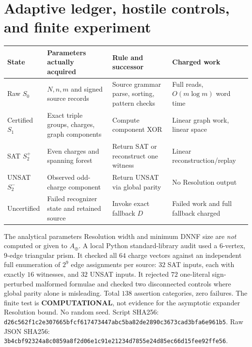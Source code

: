 \documentclass[11pt]{article}
\begin{document}
\section{Adaptive ledger, hostile controls, and finite experiment}
\small
\begin{center}
\begin{tabular}{p{.18\linewidth}p{.28\linewidth}p{.27\linewidth}p{.18\linewidth}}\toprule
State & Parameters actually acquired & Rule and successor & Charged work\\\midrule
Raw $S_0$ & $N,n,m$ and signed source records & Source grammar parse, sorting, pattern checks & Full reads, $O(m\log m)$ word time\\
Certified $S_1$ & Exact triple groups, charges, graph components & Compute component XOR & Linear graph work, linear space\\
SAT $S_2^+$ & Even charges and spanning forest & Return SAT or reconstruct one witness & Linear reconstruction/replay\\
UNSAT $S_2^-$ & Observed odd-charge component & Return UNSAT via global parity & No Resolution output\\
Uncertified & Failed recognizer state and retained source & Invoke exact fallback $D$ & Failed work and full fallback charged\\
\bottomrule
\end{tabular}
\end{center}
\normalsize
The analytical parameters Resolution width and minimum DNNF size are \emph{not} computed or given to $A_{\oplus}$. A local Python standard-library audit used a 6-vertex, 9-edge triangular prism. It checked all $64$ charge vectors against an independent full enumeration of $2^9$ edge assignments per source: $32$ SAT inputs, each with exactly $16$ witnesses, and $32$ UNSAT inputs. It rejected $72$ one-literal sign-perturbed malformed formulae and checked two disconnected controls where global parity alone is misleading. Total $138$ assertion categories, zero failures. The finite test is \textbf{COMPUTATIONAL}, not evidence for the asymptotic expander Resolution bound. No random seed. Script SHA256: \texttt{d26c562f1c2e307665bfcf617473447abc5ba82de2890c3673cad3bfa6e961b5}. Raw JSON SHA256: \texttt{3b4cbf92324a8c0859a8f2d06e1c91e21234d7855e24d85ec66d15fee92ffe56}.
\end{document}
